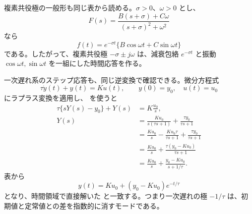 複素共役極の一般形も同じ表から読める。$\sigma>0$、$\omega>0$ とし、
\begin{equation}
  F(s)=
  \frac{B(s+\sigma)+C\omega}{(s+\sigma)^2+\omega^2}
\end{equation}
なら
\begin{equation}
  f(t)=e^{-\sigma t}\{B\cos\omega t+C\sin\omega t\}
  \label{eq:complex-mode-time}
\end{equation}
である。したがって、複素共役極 $-\sigma\pm j\omega$ は、減衰包絡 $e^{-\sigma t}$ と振動 $\cos\omega t,\sin\omega t$ を一組にした時間応答を作る。

一次遅れ系のステップ応答も、同じ逆変換で確認できる。微分方程式
\begin{equation}
  \tau\dot{y}(t)+y(t)=Ku(t),
  \qquad y(0)=y_0,\quad u(t)=u_0
\end{equation}
にラプラス変換を適用し、 を使うと
\begin{align}
  \tau\{sY(s)-y_0\}+Y(s)&=K\frac{u_0}{s},\\
  Y(s)
  &=\frac{K u_0}{s(\tau s+1)}
    +\frac{\tau y_0}{\tau s+1}\\
  &=\frac{K u_0}{s}
    -\frac{K u_0\tau}{\tau s+1}
    +\frac{\tau y_0}{\tau s+1}\\
  &=\frac{K u_0}{s}
    +\frac{\tau(y_0-Ku_0)}{\tau s+1}\\
  &=\frac{K u_0}{s}
    +\frac{y_0-Ku_0}{s+1/\tau}.
\end{align}
表から
\begin{equation}
  y(t)=K u_0+(y_0-Ku_0)e^{-t/\tau}
\end{equation}
となり、時間領域で直接解いた  と一致する。つまり一次遅れの極 $-1/\tau$ は、初期値と定常値との差を指数的に消すモードである。

